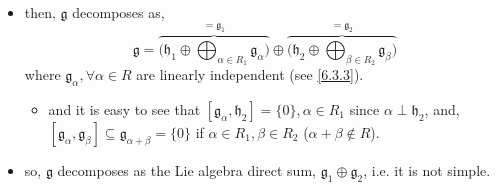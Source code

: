 \begin{itemize}
\begin{tcolorbox}[title=proof:]
\begin{itemize}
			\item then, $\mathfrak{g}$ decomposes as,
			\begin{equation}
				\mathfrak{g} = \overbrace{\Big( \mathfrak{h}_1 \oplus \bigoplus_{\alpha \in R_1} \mathfrak{g}_\alpha \Big)}^{= \mathfrak{g}_1} \oplus \overbrace{\Big( \mathfrak{h}_2 \oplus \bigoplus_{\beta \in R_2} \mathfrak{g}_\beta \Big)}^{= \mathfrak{g}_2}
			\end{equation}
			where $\mathfrak{g}_\alpha, \forall \alpha \in R$ are linearly independent (see \eqref{6.3.3}).
			\begin{itemize}
				\item and it is easy to see that $[\mathfrak{g}_\alpha, \mathfrak{h}_2] = \{0\}, \alpha \in R_1$ since $\alpha \perp \mathfrak{h}_2$, and, $[\mathfrak{g}_\alpha, \mathfrak{g}_\beta] \subseteq \mathfrak{g}_{\alpha + \beta} = \{0\}$ if $\alpha \in R_1, \beta \in R_2$ ($\alpha + \beta \notin R$).
			\end{itemize}
			
			\item so, $\mathfrak{g}$ decomposes as the Lie algebra direct sum, $\mathfrak{g}_1 \oplus \mathfrak{g}_2$, i.e. it is not simple.
		\end{itemize}
	\end{tcolorbox}
\end{itemize}

